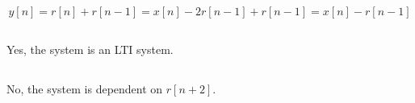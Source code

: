 \documentclass{article}
\begin{document}
\begin{equation}
    y[n] = r[n] + r[n - 1] = x[n] - 2r[n - 1] + r[n - 1] = x[n] - r[n - 1]
\end{equation}

\subsection{}

Yes, the system is an LTI system.

\subsection{}

No, the system is dependent on \(r[n + 2]\).

\subsection{}

\subsection{}

\subsection{}
\end{document}
